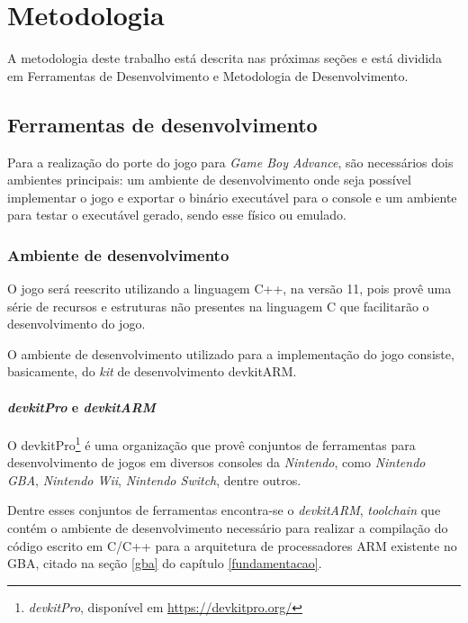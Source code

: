 \chapter[Metodologia]{Metodologia} \label{metodologia}

A metodologia deste trabalho está descrita nas próximas seções e está dividida em Ferramentas de Desenvolvimento e Metodologia de Desenvolvimento.

\section{Ferramentas de desenvolvimento}

  Para a realização do porte do jogo para \textit{Game Boy Advance}, são necessários dois ambientes principais: um ambiente de desenvolvimento onde seja possível implementar o jogo e exportar o binário executável para o console e um ambiente para testar o executável gerado, sendo esse físico ou emulado.

  \subsection{Ambiente de desenvolvimento}

    O jogo será reescrito utilizando a linguagem C++, na versão 11, pois provê uma série de recursos e estruturas não presentes na linguagem C que facilitarão o desenvolvimento do jogo.

    O ambiente de desenvolvimento utilizado para a implementação do jogo consiste, basicamente, do \textit{kit} de desenvolvimento devkitARM.

    \subsubsection{\textit{devkitPro} e \textit{devkitARM}}

      O devkitPro\footnote{\textit{devkitPro}, disponível em \url{https://devkitpro.org/}} é uma organização que provê conjuntos de ferramentas para desenvolvimento de jogos em diversos consoles da \textit{Nintendo}, como \textit{Nintendo GBA}, \textit{Nintendo Wii}, \textit{Nintendo Switch}, dentre outros.

      Dentre esses conjuntos de ferramentas encontra-se o \textit{devkitARM}, \textit{toolchain} que contém o ambiente de desenvolvimento necessário para realizar a compilação do código escrito em C/C++ para a arquitetura de processadores ARM existente no GBA, citado na seção \ref{gba} do capítulo \ref{fundamentacao}.

